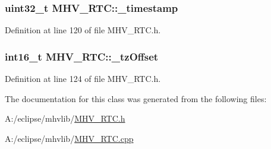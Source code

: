 \hypertarget{class_m_h_v___r_t_c_a6ac0d6f1b8985cd6113249693da50104}{
\subsubsection[{\-\_\-timestamp}]{\setlength{\rightskip}{0pt plus 5cm}uint32\-\_\-t {\bf \-M\-H\-V\-\_\-\-R\-T\-C\-::\-\_\-timestamp}}}
\label{class_m_h_v___r_t_c_a6ac0d6f1b8985cd6113249693da50104}


\-Definition at line 120 of file \-M\-H\-V\-\_\-\-R\-T\-C.\-h.

\hypertarget{class_m_h_v___r_t_c_af9e544307713892ec196261247213490}{
\subsubsection[{\-\_\-tz\-Offset}]{\setlength{\rightskip}{0pt plus 5cm}int16\-\_\-t {\bf \-M\-H\-V\-\_\-\-R\-T\-C\-::\-\_\-tz\-Offset}}}
\label{class_m_h_v___r_t_c_af9e544307713892ec196261247213490}


\-Definition at line 124 of file \-M\-H\-V\-\_\-\-R\-T\-C.\-h.



\-The documentation for this class was generated from the following files\-:\begin{DoxyCompactItemize}
\item 
\-A\-:/eclipse/mhvlib/\hyperlink{_m_h_v___r_t_c_8h}{\-M\-H\-V\-\_\-\-R\-T\-C.\-h}\item 
\-A\-:/eclipse/mhvlib/\hyperlink{_m_h_v___r_t_c_8cpp}{\-M\-H\-V\-\_\-\-R\-T\-C.\-cpp}\end{DoxyCompactItemize}
